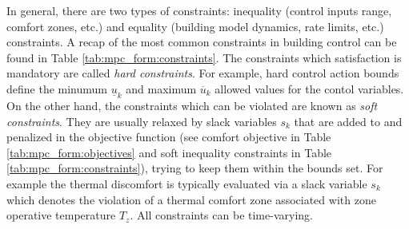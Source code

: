 \documentclass[10pt]{extarticle}
\begin{document}
In general, there are two types of constraints:
inequality (control inputs range, comfort zones, etc.) and equality 
(building model dynamics, rate limits, etc.) constraints.
A recap of the most common constraints in building control can be found in
Table \ref{tab:mpc_form:constraints}.
The constraints which satisfaction is mandatory are called 
\textit{hard constraints}. For example, hard control action
bounds define the minumum $\underline{u}_k$ and maximum $\overline{u}_k$ allowed values for the contol variables.
 On the other hand, the constraints which can 
be violated are known as \textit{soft constraints}. They are usually relaxed
by slack variables $s_k$ that are added to and
penalized in the objective function (see comfort objective in Table
\ref{tab:mpc_form:objectives} and soft inequality constraints in Table \ref{tab:mpc_form:constraints}), trying to keep them within the bounds set. 
For example the thermal discomfort is typically evaluated via a slack variable $s_k$ which denotes the violation of a thermal comfort zone associated with zone operative temperature $T_z$.
All constraints can be time-varying.
\end{document}
